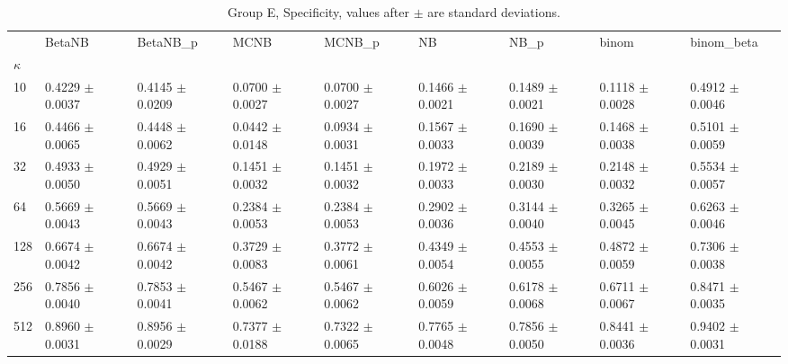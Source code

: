 \begin{table}[H]
\centering
\begin{adjustbox}{max width=\linewidth}
\begin{tabular}{lllllllll}
\toprule
 & BetaNB & BetaNB\_p & MCNB & MCNB\_p & NB & NB\_p & binom & binom\_beta \\
$\kappa$ &  &  &  &  &  &  &  &  \\
\midrule
10 & 0.4229 $\pm$ 0.0037 & 0.4145 $\pm$ 0.0209 & 0.0700 $\pm$ 0.0027 & 0.0700 $\pm$ 0.0027 & 0.1466 $\pm$ 0.0021 & 0.1489 $\pm$ 0.0021 & 0.1118 $\pm$ 0.0028 & 0.4912 $\pm$ 0.0046 \\
16 & 0.4466 $\pm$ 0.0065 & 0.4448 $\pm$ 0.0062 & 0.0442 $\pm$ 0.0148 & 0.0934 $\pm$ 0.0031 & 0.1567 $\pm$ 0.0033 & 0.1690 $\pm$ 0.0039 & 0.1468 $\pm$ 0.0038 & 0.5101 $\pm$ 0.0059 \\
32 & 0.4933 $\pm$ 0.0050 & 0.4929 $\pm$ 0.0051 & 0.1451 $\pm$ 0.0032 & 0.1451 $\pm$ 0.0032 & 0.1972 $\pm$ 0.0033 & 0.2189 $\pm$ 0.0030 & 0.2148 $\pm$ 0.0032 & 0.5534 $\pm$ 0.0057 \\
64 & 0.5669 $\pm$ 0.0043 & 0.5669 $\pm$ 0.0043 & 0.2384 $\pm$ 0.0053 & 0.2384 $\pm$ 0.0053 & 0.2902 $\pm$ 0.0036 & 0.3144 $\pm$ 0.0040 & 0.3265 $\pm$ 0.0045 & 0.6263 $\pm$ 0.0046 \\
128 & 0.6674 $\pm$ 0.0042 & 0.6674 $\pm$ 0.0042 & 0.3729 $\pm$ 0.0083 & 0.3772 $\pm$ 0.0061 & 0.4349 $\pm$ 0.0054 & 0.4553 $\pm$ 0.0055 & 0.4872 $\pm$ 0.0059 & 0.7306 $\pm$ 0.0038 \\
256 & 0.7856 $\pm$ 0.0040 & 0.7853 $\pm$ 0.0041 & 0.5467 $\pm$ 0.0062 & 0.5467 $\pm$ 0.0062 & 0.6026 $\pm$ 0.0059 & 0.6178 $\pm$ 0.0068 & 0.6711 $\pm$ 0.0067 & 0.8471 $\pm$ 0.0035 \\
512 & 0.8960 $\pm$ 0.0031 & 0.8956 $\pm$ 0.0029 & 0.7377 $\pm$ 0.0188 & 0.7322 $\pm$ 0.0065 & 0.7765 $\pm$ 0.0048 & 0.7856 $\pm$ 0.0050 & 0.8441 $\pm$ 0.0036 & 0.9402 $\pm$ 0.0031 \\
\bottomrule
\end{tabular}

\end{adjustbox}
\caption{Group E, Specificity, values after $\pm$ are standard deviations.}
\end{table}
